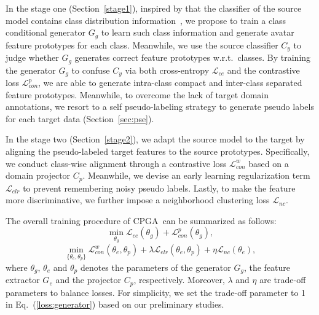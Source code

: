 \documentclass{article}
\def\wrt{w.r.t.~}
\def\ournet{CPGA}
\begin{document}
 
In the stage one (Section~\ref{stage1}), inspired by that the classifier of the source model contains class distribution information~\cite{Xu2020GenerativeLD}, we propose to train a class conditional generator $G_{g}$ to learn such class information and generate avatar feature prototypes for each class. Meanwhile, we use the source classifier $C_{y}$ to judge whether $G_{g}$ generates correct feature prototypes \wrt classes. By training the generator $G_g$ to confuse $C_{y}$  via both cross-entropy $\mathcal{L}_{ce}$ and the contrastive loss $\mathcal{L}_{con}^{p}$, we are able to generate intra-class compact and inter-class separated feature prototypes.  
Meanwhile, to overcome the lack of target domain annotations, we resort to a self pseudo-labeling strategy to generate pseudo labels for each target data (Section~\ref{sec:pse}).

In the stage two (Section~\ref{stage2}), we adapt the source model to the target by aligning the pseudo-labeled target features to the source prototypes.  Specifically, we conduct class-wise alignment through a contrastive loss $\mathcal{L}_{con}^{w}$ based on a domain projector $C_p$. Meanwhile,  we devise an early learning regularization term $\mathcal{L}_{elr}$ to prevent remembering noisy pseudo labels. Lastly, to make the feature more discriminative, we further impose a neighborhood clustering loss $\mathcal{L}_{nc}$.  


The overall training procedure of \ournet~can be summarized as follows:
\begin{equation}
\label{loss:generator}
\min_{\theta_{g}} \mathcal{L}_{ce}(\theta_{g}) + \mathcal{L}_{con}^{p}(\theta_{g}),
\end{equation}
\vspace{-3.5mm}
\begin{equation}
\label{loss:extractor}
\min_{\{\theta_{e}, \theta_{p}\}} \mathcal{L}_{con}^{w}(\theta_{e}, \theta_{p}) + \lambda \mathcal{L}_{elr}(\theta_{e}, \theta_{p}) + \eta \mathcal{L}_{nc}(\theta_{e}),
\end{equation}
where $\theta_{g}$, $\theta_{e}$ and $\theta_{p}$ denotes the parameters of the generator $G_{g}$, the feature extractor $G_{e}$ and the projector $C_{p}$, respectively. Moreover,  $\lambda$ and $\eta$ are  trade-off parameters to balance losses. For simplicity, we set the trade-off parameter to 1  in Eq.~(\ref{loss:generator}) based on our preliminary studies.
\end{document}
